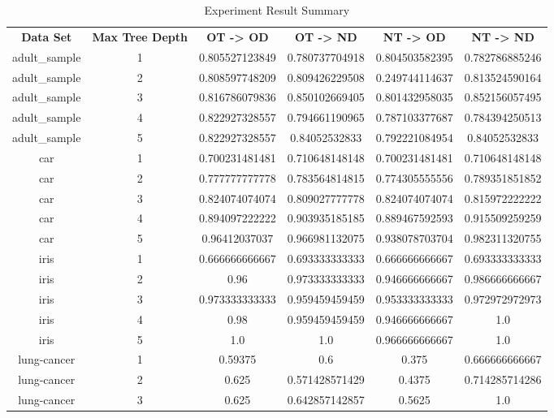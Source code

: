 \documentclass{sig-alternate}
\begin{document}
\begin{table*}[!t]
    \caption{Experiment Result Summary}
    \label{table:experiment_result_summary}
    \centering
    \begin{tabular}{cccccc}
        \rowcolor{gray!50}
        \textbf{Data Set} & \textbf{Max Tree Depth} & \textbf{OT -> OD} & \textbf{OT -> ND} & \textbf{NT -> OD} & \textbf{NT -> ND} \\
        adult\_sample & 1 & 0.805527123849 & 0.780737704918 & 0.804503582395 & 0.782786885246 \\
        adult\_sample & 2 & 0.808597748209 & 0.809426229508 & 0.249744114637 & 0.813524590164 \\
        adult\_sample & 3 & 0.816786079836 & 0.850102669405 & 0.801432958035 & 0.852156057495 \\
        adult\_sample & 4 & 0.822927328557 & 0.794661190965 & 0.787103377687 & 0.784394250513 \\
        adult\_sample & 5 & 0.822927328557 & 0.84052532833 & 0.792221084954 & 0.84052532833 \\
        car & 1 & 0.700231481481 & 0.710648148148 & 0.700231481481 & 0.710648148148 \\
        car & 2 & 0.777777777778 & 0.783564814815 & 0.774305555556 & 0.789351851852 \\
        car & 3 & 0.824074074074 & 0.809027777778 & 0.824074074074 & 0.815972222222 \\
        car & 4 & 0.894097222222 & 0.903935185185 & 0.889467592593 & 0.915509259259 \\
        car & 5 & 0.96412037037 & 0.966981132075 & 0.938078703704 & 0.982311320755 \\
        iris & 1 & 0.666666666667 & 0.693333333333 & 0.666666666667 & 0.693333333333 \\
        iris & 2 & 0.96 & 0.973333333333 & 0.946666666667 & 0.986666666667 \\
        iris & 3 & 0.973333333333 & 0.959459459459 & 0.953333333333 & 0.972972972973 \\
        iris & 4 & 0.98 & 0.959459459459 & 0.946666666667 & 1.0 \\
        iris & 5 & 1.0 & 1.0 & 0.966666666667 & 1.0 \\
        lung-cancer & 1 & 0.59375 & 0.6 & 0.375 & 0.666666666667 \\
        lung-cancer & 2 & 0.625 & 0.571428571429 & 0.4375 & 0.714285714286 \\
        lung-cancer & 3 & 0.625 & 0.642857142857 & 0.5625 & 1.0 \\

\end{tabular}
\end{table*}
\end{document}
